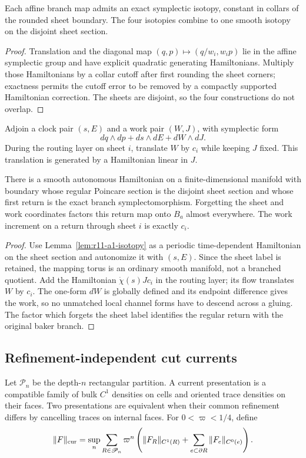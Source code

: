 \begin{lemma}
\label{lem:r11-a1-isotopy}
Each affine branch map admits an exact symplectic isotopy, constant in collars
of the rounded sheet boundary.  The four isotopies combine to one smooth
isotopy on the disjoint sheet section.
\end{lemma}

\begin{proof}
Translation and the diagonal map
$(q,p)\mapsto(q/w_i,w_i p)$ lie in the affine symplectic group and have
explicit quadratic generating Hamiltonians.  Multiply those Hamiltonians by
a collar cutoff after first rounding the sheet corners; exactness permits the
cutoff error to be removed by a compactly supported Hamiltonian correction.
The sheets are disjoint, so the four constructions do not overlap.
\end{proof}

Adjoin a clock pair $(s,E)$ and a work pair $(W,J)$, with symplectic form
\[
 dq\wedge dp+ds\wedge dE+dW\wedge dJ.
\]
During the routing layer on sheet $i$, translate $W$ by $c_i$ while
keeping $J$ fixed.  This translation is generated by a Hamiltonian linear
in $J$.

\begin{theorem}
\label{thm:r11-a1-suspension}
There is a smooth autonomous Hamiltonian on a finite-dimensional manifold
with boundary whose regular Poincare section is the disjoint sheet section
and whose first return is the exact branch symplectomorphism.  Forgetting the
sheet and work coordinates factors this return map onto $B_a$ almost
everywhere.  The work increment on a return through sheet $i$ is exactly
$c_i$.
\end{theorem}

\begin{proof}
Use Lemma~\ref{lem:r11-a1-isotopy} as a periodic time-dependent Hamiltonian on
the sheet section and autonomize it with $(s,E)$.  Since the sheet label is
retained, the mapping torus is an ordinary smooth manifold, not a branched
quotient.  Add the Hamiltonian $\dot\chi(s)Jc_i$ in the routing layer; its
flow translates $W$ by $c_i$.  The one-form $dW$ is globally defined
and its endpoint difference gives the work, so no unmatched local channel
forms have to descend across a gluing.  The factor which forgets the sheet
label identifies the regular return with the original baker branch.
\end{proof}

\subsection{Refinement-independent cut currents}
Let $\mathscr P_n$ be the depth-$n$ rectangular partition.  A current
presentation is a compatible family of bulk $C^1$ densities on cells and
oriented trace densities on their faces.  Two presentations are equivalent
when their common refinement differs by cancelling traces on internal faces.
For $0<\varpi<1/4$, define
\[
 \|F\|_{\rm cur}
 =\sup_n\sum_{R\in\mathscr P_n}\varpi^n
 \left(\|F_R\|_{C^1(R)}+
       \sum_{e\subset\partial R}\|F_e\|_{C^0(e)}\right).
\]

